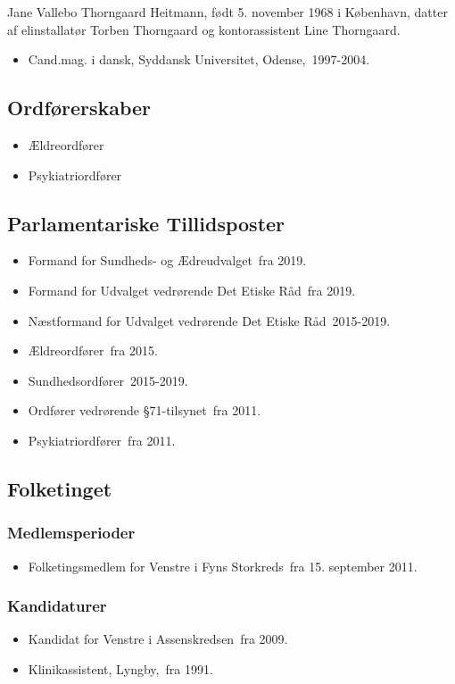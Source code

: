 \documentclass[11pt, a4paper]{awesome-cv}
\begin{document}
\makecvheader[R]
\makelettertitle
\begin{cvletter}
Jane Vallebo Thorngaard Heitmann, født 5. november 1968 i København, datter af elinstallatør Torben Thorngaard og kontorassistent Line Thorngaard.

\begin{itemize}
\item Cand.mag. i dansk, Syddansk Universitet, Odense, 1997-2004.
\end{itemize}
\subsection*{Ordførerskaber}
\begin{itemize}
\item Ældreordfører
\item Psykiatriordfører
\end{itemize}
\subsection*{Parlamentariske Tillidsposter}
\begin{itemize}
\item Formand for Sundheds- og Ædreudvalget fra 2019.
\item Formand for Udvalget vedrørende Det Etiske Råd fra 2019.
\item Næstformand for Udvalget vedrørende Det Etiske Råd 2015-2019.
\item Ældreordfører fra 2015.
\item Sundhedsordfører 2015-2019.
\item Ordfører vedrørende §71-tilsynet fra 2011.
\item Psykiatriordfører fra 2011.
\end{itemize}
\subsection*{Folketinget}
\subsubsection*{Medlemsperioder}
\begin{itemize}
\item Folketingsmedlem for Venstre i Fyns Storkreds fra 15. september 2011.
\end{itemize}
\subsubsection*{Kandidaturer}
\begin{itemize}
\item Kandidat for Venstre i Assenskredsen fra 2009.
\end{itemize}
\begin{itemize}
\item Klinikassistent, Lyngby, fra 1991.
\end{itemize}
\end{cvletter}
\end{document}
